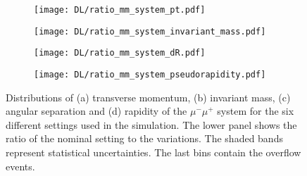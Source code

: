 \begin{figure}[H]
    \centering
    \begin{subfigure}{0.49\textwidth}
        \centering
        \texttt{[image: DL/ratio\_mm\_system\_pt.pdf]}
        \caption{}
        \label{app:subfig:pt(mm)_DL}
    \end{subfigure}
    \begin{subfigure}{0.49\textwidth}
        \centering
        \texttt{[image: DL/ratio\_mm\_system\_invariant\_mass.pdf]}
        \caption{}
        \label{app:subfig:m(mm)_DL}
    \end{subfigure}

    \vspace{0.2cm}
    
    \begin{subfigure}{0.49\textwidth}
        \centering
        \texttt{[image: DL/ratio\_mm\_system\_dR.pdf]}
        \caption{}
        \label{app:subfig:dR(mm)_DL}
    \end{subfigure}
    \begin{subfigure}{0.49\textwidth}
        \centering
        \texttt{[image: DL/ratio\_mm\_system\_pseudorapidity.pdf]}
        \caption{}
        \label{app:subfig:eta(mm)_DL}
    \end{subfigure}
    \caption{Distributions of (a) transverse momentum, (b) invariant mass,  (c) angular separation and (d) rapidity of the $\mu^-\mu^+$ system for the six different settings used in the simulation. The lower panel shows the ratio of the nominal setting to the variations. The shaded bands represent statistical uncertainties. The last bins contain the overflow events.}
    \label{app:fig:mumu_DL}
\end{figure}

